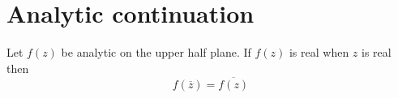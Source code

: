 \section{Analytic continuation}

	\begin{theorem}
		Let $f(z)$ be analytic on the upper half plane. If $f(z)$ is real when $z$ is real then
	        \begin{equation}
	        	f(\overline{z}) = \overline{f(z)}
	        \end{equation}
	\end{theorem}
